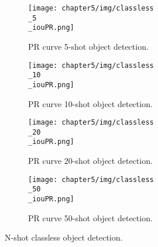 \begin{figure}[H]
    \begin{adjustwidth}{-0.5in}{-0.5in}
        \centering
        \begin{subfigure}[b]{0.4\pdfpagewidth}
            \texttt{[image: chapter5/img/classless\\\_5\\\_iouPR.png]}
            \caption{PR curve 5-shot object detection.}
            \label{fig:5_n_shot_classless_5}
        \end{subfigure}
        \hfill
        \begin{subfigure}[b]{0.4\pdfpagewidth}
            \texttt{[image: chapter5/img/classless\\\_10\\\_iouPR.png]}
            \caption{PR curve 10-shot object detection.}
            \label{fig:5_n_shot_classless_10}
        \end{subfigure}
        \begin{subfigure}[b]{0.4\pdfpagewidth}
            \texttt{[image: chapter5/img/classless\\\_20\\\_iouPR.png]}
            \caption{PR curve 20-shot object detection.}
            \label{fig:5_n_shot_classless_20}
        \end{subfigure}
        \hfill
        \begin{subfigure}[b]{0.4\pdfpagewidth}
            \texttt{[image: chapter5/img/classless\\\_50\\\_iouPR.png]}
            \caption{PR curve 50-shot object detection.}
            \label{fig:5_n_shot_classless_50}
        \end{subfigure}
    \end{adjustwidth}
    \caption{N-shot classless object detection.}
    \label{fig:5_n_shot_classless}
\end{figure}


